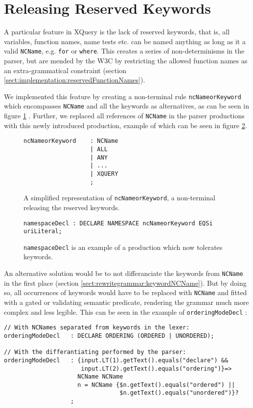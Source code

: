 \section{Releasing Reserved Keywords}
\label{sect:impl:reserved_keywords}
A particular feature in XQuery is the lack of reserved keywords, that is, all variables, function names, name tests etc. can be named anything as long as it a valid \verb!NCName!, e.g. \verb!for! or \verb!where!. This creates a series of non-determinisms in the parser, but are mended by the W3C by restricting the allowed function names as an extra-grammatical constraint (section \ref{sect:implementation:reservedFunctionNames}).

We implemented this feature by creating a non-terminal rule \verb!ncNameorKeyword! which encompasses \verb!NCName! and all the keywords as alternatives, as can be seen in figure \ref{fig:ncnNameorKeyword} . Further, we replaced all references of \verb!NCName! in the parser productions with this newly introduced production, example of which can be seen in figure \ref{fig:namespaceDeclKeywordfree}.

\begin{figure}[h!]
\begin{Verbatim}
ncNameorKeyword    : NCName
                   | ALL
                   | ANY
                   | ...
                   | XQUERY
                   ;
\end{Verbatim}
\label{fig:ncnNameorKeyword}
\caption[\texttt{ncNameorKeyword} releases the reserved keywords]{A simplified representation of \texttt{ncNameorKeyword}, a non-terminal releasing the reserved keywords.}
\end{figure}

\begin{figure}[h!]
\begin{Verbatim}
namespaceDecl : DECLARE NAMESPACE ncNameorKeyword EQSi uriLiteral;
\end{Verbatim}
\label{fig:namespaceDeclKeywordfree}
\caption[Example of a production permitting keywords]{\texttt{namespaceDecl} is an example of a production which now tolerates keywords.}
\end{figure}

An alternative solution would be to not differanciate the keywords from \verb!NCName! in the first place (section \ref{sect:rewritegrammar:keywordNCName}). But by doing so, all occurrences of keywords would have to be replaced with \verb!NCName! and fitted with a gated or validating semantic predicate, rendering the grammar much more complex and less legible. This can be seen in the example of \verb!orderingModeDecl! :
\begin{Verbatim}
// With NCNames separated from keywords in the lexer:
orderingModeDecl   : DECLARE ORDERING (ORDERED | UNORDERED);

// With the differantiating performed by the parser:
orderingModeDecl   : {input.LT(1).getText().equals("declare") && 
                      input.LT(2).getText().equals("ordering")}=>
                     NCName NCName
                     n = NCName {$n.getText().equals("ordered") || 
                                 $n.getText().equals("unordered")}?
                   ;
\end{Verbatim}

